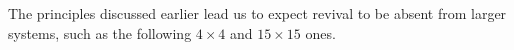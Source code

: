 \documentclass[prb, twocolumn, final]{revtex4-1}
\theoremstyle{plain}
\begin{document}

The principles discussed earlier lead us to expect revival to be absent from
larger systems, such as the following $4\times4$ and $15\times15$ ones.

\end{document}
